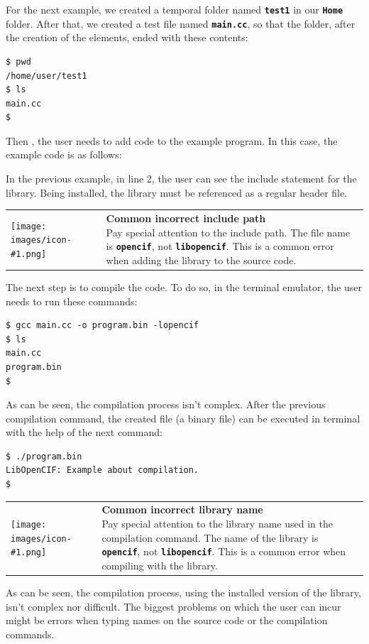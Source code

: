 \documentclass[11pt,twoside,openany,x11names,svgnames]{memoir}
\makeatletter
\newcommand{\IconNote}[3]
{
	\begin{table}[ht]
	\begin{tabular}{ lm{\dimexpr\textwidth-8\tabcolsep-\wd0}@{}}
		\toprule
		\texttt{[image: images/icon-\#1.png]}
		&
		\parbox[t]{155mm}{
		\textbf{#2} \\
		#3
		}
	\end{tabular}
\end{table}
}
\makeatother
\begin{document}
For the next example, we created a temporal folder named \textbf{\texttt{test1}} in our  \textbf{\texttt{Home}} folder. After that, we created a test file named \textbf{\texttt{main.cc}}, so that the folder, after the creation of the elements, ended with these contents:

\begin{lstlisting}[frame=single,style=SystemCommandStyle]
$ pwd
/home/user/test1
$ ls
main.cc
$
\end{lstlisting}

Then , the user needs to add code to the example program. In this case, the example code is as follows:



In the previous example, in line 2, the user can see the include statement for the library. Being installed, the library must be referenced as a regular header file.

\IconNote
	{warning}
	{Common incorrect include path}
	{Pay special attention to the include path. The file name is \textbf{\texttt{opencif}}, not \textbf{\texttt{libopencif}}. This is a common error when adding the library to the source code.}
	
The next step is to compile the code. To do so, in the terminal emulator, the user needs to run these commands:

\begin{lstlisting}[frame=single,style=SystemCommandStyle]
$ gcc main.cc -o program.bin -lopencif
$ ls
main.cc
program.bin
$
\end{lstlisting}

As can be seen, the compilation process isn't complex. After the previous compilation command, the created file (a binary file) can be executed in terminal with the help of the next command:

\begin{lstlisting}[frame=single,style=SystemCommandStyle]
$ ./program.bin
LibOpenCIF: Example about compilation.
$
\end{lstlisting}

\IconNote
	{warning}
	{Common incorrect library name}
	{Pay special attention to the library name used in the compilation command. The name of the library is \textbf{\texttt{opencif}}, not \textbf{\texttt{libopencif}}. This is a common error when compiling with the library.}
	
As can be seen, the compilation process, using the installed version of the library, isn't complex nor difficult. The biggest problems on which the user can incur might be errors when typing names on the source code or the compilation commands.
\end{document}
